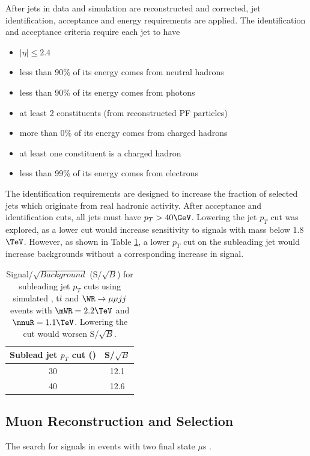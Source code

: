 After jets in data and simulation are reconstructed and corrected, jet
identification, acceptance and energy requirements are applied.  The
identification and acceptance criteria require each jet to have

\begin{itemize}
	\item $|\eta| \leq 2.4$
	\item less than 90\% of its energy comes from neutral hadrons
	\item less than 90\% of its energy comes from photons
	\item at least 2 constituents (from reconstructed PF particles)
	\item more than 0\% of its energy comes from charged hadrons
	\item at least one constituent is a charged hadron
	\item less than 99\% of its energy comes from electrons
\end{itemize}

The identification requirements are designed to increase the fraction of
selected jets which originate from real hadronic activity.  After acceptance
and identification cuts, all jets must have $p_{T} > 40 \GeV$.  Lowering
the jet $p_{T}$ cut was explored, as a lower cut would increase sensitivity
to \WR signals with \WR mass below 1.8 $\TeV$.  However, as shown in Table
\ref{tab:lowerJetPtCuts}, a lower $p_{T}$ cut on the subleading jet would
increase backgrounds without a corresponding increase in \WR signal.

\begin{table}[h]
	\caption{Signal/$\sqrt{Background}$ (S/$\sqrt{B}$) for subleading jet $p_{T}$
		cuts using simulated \DY, t$\bar{t}$ and $\WR \rightarrow \mu\mu jj$ events
	with $\mWR = 2.2 \TeV$ and $\mnuR = 1.1 \TeV$.  Lowering the cut would worsen S/$\sqrt{B}$.}
	\label{tab:lowerJetPtCuts}
	\centering
	\begin{tabular}{c|c}
		Sublead jet $p_{T}$ cut (\GeV) & S/$\sqrt{B}$ \\  \hline
		30 &  12.1  \\ \hline
		40 &  12.6  \\ \hline
	\end{tabular}
\end{table}

\subsection{Muon Reconstruction and Selection}
\label{muonRecoAndSelection}
The search for \WR signals in events with two final state $\mu$s .

